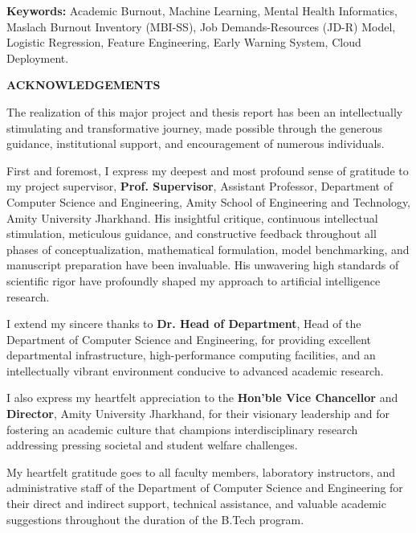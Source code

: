 \documentclass[12pt,a4paper,oneside]{report}
\begin{document}
\vspace{0.8cm}
\noindent
\textbf{Keywords:} Academic Burnout, Machine Learning, Mental Health Informatics, Maslach Burnout Inventory (MBI-SS), Job Demands-Resources (JD-R) Model, Logistic Regression, Feature Engineering, Early Warning System, Cloud Deployment.

\clearpage

\thispagestyle{plain}
\begin{center}
    {\LARGE \textbf{ACKNOWLEDGEMENTS}}\\[0.8cm]
\end{center}

The realization of this major project and thesis report has been an intellectually stimulating and transformative journey, made possible through the generous guidance, institutional support, and encouragement of numerous individuals.

First and foremost, I express my deepest and most profound sense of gratitude to my project supervisor, \textbf{Prof. Supervisor}, Assistant Professor, Department of Computer Science and Engineering, Amity School of Engineering and Technology, Amity University Jharkhand. His insightful critique, continuous intellectual stimulation, meticulous guidance, and constructive feedback throughout all phases of conceptualization, mathematical formulation, model benchmarking, and manuscript preparation have been invaluable. His unwavering high standards of scientific rigor have profoundly shaped my approach to artificial intelligence research.

I extend my sincere thanks to \textbf{Dr. Head of Department}, Head of the Department of Computer Science and Engineering, for providing excellent departmental infrastructure, high-performance computing facilities, and an intellectually vibrant environment conducive to advanced academic research.

I also express my heartfelt appreciation to the \textbf{Hon'ble Vice Chancellor} and \textbf{Director}, Amity University Jharkhand, for their visionary leadership and for fostering an academic culture that champions interdisciplinary research addressing pressing societal and student welfare challenges.

My heartfelt gratitude goes to all faculty members, laboratory instructors, and administrative staff of the Department of Computer Science and Engineering for their direct and indirect support, technical assistance, and valuable academic suggestions throughout the duration of the B.Tech program.
\end{document}
